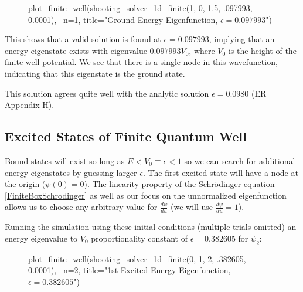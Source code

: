 \documentclass{article}
\begin{document}
\vspace{-.2in}
\begin{figure}[H]
\begin{sageblock}
plot_finite_well(shooting_solver_1d_finite(1, 0, 1.5, .097993, 0.0001), \
                 n=1, title="Ground Energy Eigenfunction, $\epsilon=0.097993$")
\end{sageblock}
\vspace{-.1in}
\centering
{}
\end{figure}

This shows that a valid solution is found at $\epsilon = 0.097993$, implying
that an energy eigenstate exists with eigenvalue $0.097993V_0$, where $V_0$ is
the height of the finite well potential. We see that there is a single node in
this wavefunction, indicating that this eigenstate is the ground state.

This solution agrees quite well with the analytic solution $\epsilon = 0.0980$
(ER Appendix H).

\subsection{Excited States of Finite Quantum Well}

Bound states will exist so long as $E < V_0 \equiv \epsilon < 1$ so we can
search for additional energy eigenstates by guessing larger $\epsilon$. The
first excited state will have a node at the origin ($\psi(0) = 0$). The
linearity property of the Schr\"{o}dinger equation \eqref{FiniteBoxSchrodinger} as
well as our focus on the unnormalized eigenfunction allows us to choose any
arbitrary value for $\frac{d\psi}{du}$ (we will use $\frac{d\psi}{du}=1$).

Running the simulation using these initial conditions (multiple trials omitted)
an energy eigenvalue to $V_0$ proportionality constant of $\epsilon = 0.382605$
for $\psi_2$:

\begin{figure}[H]
\begin{sageblock}
plot_finite_well(shooting_solver_1d_finite(0, 1, 2, .382605, 0.0001), \
                 n=2, title="1st Excited Energy Eigenfunction, $\epsilon=0.382605$")
\end{sageblock}
\vspace{-.1in}
\centering
{}
\end{figure}
\end{document}
